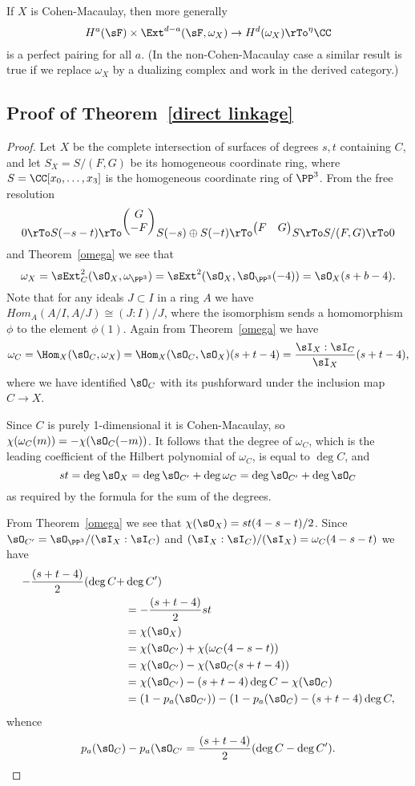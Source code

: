 \begin{fact}
If $X$ is Cohen-Macaulay, then more generally
$$
H^a(\sF) \times \Ext^{d-a}(\sF, \omega_X) \to H^d(\omega_X) \rTo^\eta \CC
$$
is a perfect pairing for all $a$. (In the non-Cohen-Macaulay case a similar result is true if we replace $\omega_X$ by a dualizing complex
and work in the derived category.) 
\end{fact}


\subsection{Proof of Theorem~\ref{direct linkage}}

\begin{proof}
 Let $X$ be the complete intersection of surfaces of degrees $s,t$ containing $C$, and let $S_X = S/(F,G)$ be its homogeneous coordinate ring, where
$S = \CC[x_0,\dots,x_3]$ is the homogeneous coordinate ring of $\PP^3$.
From the free resolution
$$
0\rTo S(-s-t) \rTo^{
\begin{pmatrix}
 G \\ -F
\end{pmatrix}}
 S(-s)\oplus S(-t) \rTo^{
\begin{pmatrix}
 F & G
\end{pmatrix}}
 S \rTo S/(F,G) \rTo 0
$$
 and Theorem~\ref{omega} we see that
 $$
\omega_X =  \sExt^2_C(\sO_X, \omega_{\PP^3}) =\sExt^2(\sO_X, \sO_{\PP^3}(-4)) = \sO_X(s+b-4).
 $$
Note that for any ideals $J\subset I$ in a ring $A$ we have $Hom_A(A/I, A/J) \cong (J:I)/J$, where the isomorphism
sends a homomorphism $\phi$ to the element $\phi(1)$. Again from Theorem~\ref{omega} we have 
$$
\omega_C = \Hom_X(\sO_C, \omega_X) = \Hom_X(\sO_C, \sO_X)(s+t-4) = \frac{\sI_X:\sI_C}{\sI_X}(s+t-4),
$$
where we have identified $\sO_C$ with its pushforward under the inclusion map $C\to X$. 

Since $C$ is purely 1-dimensional it is Cohen-Macaulay, so
$\chi(\omega_C(m)) = -\chi(\sO_C(-m))$. It follows that the degree of $\omega_C$, which is the leading coefficient of the Hilbert polynomial of $\omega_C$, is 
equal to $\deg C$, and 
$$
st = \deg \sO_X =\deg \sO_{C'}+\deg \omega_C = \deg \sO_{C'}+\deg \sO_C
$$
as required by the formula for the sum of the degrees.

From Theorem~\ref{omega} we see that $\chi(\sO_X) = st(4-s-t)/2$. Since $\sO_{C'} = \sO_{\PP^3}/(\sI_X : \sI_C)$ and
$(\sI_X : \sI_C)/(\sI_X) = \omega_C(4-s-t)$ we have
$$
\begin{aligned}
-\frac{(s+t-4)}{2} (\deg C +& \deg C') \\&= -\frac{(s+t-4)}{2}st \\
&= \chi(\sO_X) \\&=  \chi(\sO_{C'})+\chi(\omega_C(4-s-t)) \\&= \chi(\sO_{C'})-\chi(\sO_C(s+t-4)) \\&= \chi(\sO_{C'})-(s+t-4)\deg C-\chi(\sO_C)
\\&= (1-p_a(\sO_{C'})) - (1-p_a(\sO_C) -(s+t-4)\deg C,
\end{aligned}
$$
whence 
$$
p_a(\sO_C) -p_a(\sO_{C'} = \frac{(s+t-4)}{2} (\deg C - \deg C'). 
$$
 \end{proof}

